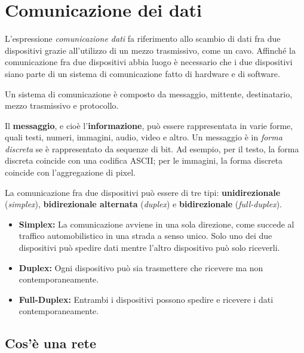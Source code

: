 \section{Comunicazione dei dati}

L’espressione \textit{comunicazione dati} fa riferimento allo scambio di dati fra due
dispositivi grazie all’utilizzo di un mezzo trasmissivo, come un cavo. Affinché la comunicazione fra due dispositivi abbia luogo è necessario che i due dispositivi siano parte di un sistema di comunicazione fatto di hardware e di software.

\vspace{3mm}

Un sistema di comunicazione è composto da messaggio, mittente, destinatario, mezzo trasmissivo e protocollo.

\vspace{3mm}

Il \textbf{messaggio}, e cioè l'\textbf{informazione}, può essere rappresentata in varie forme, quali testi, numeri, immagini, audio, video e altro. Un messaggio è in \textit{forma discreta} se è rappresentato da sequenze di bit. Ad esempio, per il testo, la forma discreta coincide con una codifica ASCII; per le immagini, la forma discreta coincide con l'aggregazione di pixel.

\vspace{3mm}

La comunicazione fra due dispositivi può essere di tre tipi: \textbf{unidirezionale} (\textit{simplex}), \textbf{bidirezionale alternata} (\textit{duplex}) e \textbf{bidirezionale} (\textit{full-duplex}).

\begin{itemize}
    \item 
    \textbf{Simplex:} La comunicazione avviene in una sola direzione, come succede al traffico automobilistico in una strada a senso unico. Solo uno dei due dispositivi può spedire dati mentre l’altro dispositivo può solo riceverli.

    \item
    \textbf{Duplex:} Ogni dispositivo può sia trasmettere che ricevere ma non contemporaneamente.
    
    \item
    \textbf{Full-Duplex:} Entrambi i dispositivi possono spedire e ricevere i dati contemporaneamente.
\end{itemize}

\subsection{Cos'è una rete}

